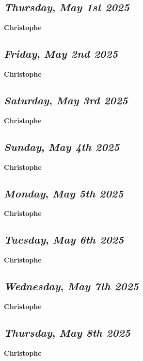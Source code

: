 \begin{center}
\section*{\month}
\end{center}

\def\day{\textit{May 1st 2025}}
\def\weekday{\textit{Thursday}}
\subsection*{\weekday, \day}
\textbf {Christophe}

\def\day{\textit{May 2nd 2025}}
\def\weekday{\textit{Friday}}
\subsection*{\weekday, \day}
\textbf {Christophe}

\def\day{\textit{May 3rd 2025}}
\def\weekday{\textit{Saturday}}
\subsection*{\weekday, \day}
\textbf {Christophe}

\def\day{\textit{May 4th 2025}}
\def\weekday{\textit{Sunday}}
\subsection*{\weekday, \day}
\textbf {Christophe}

\def\day{\textit{May 5th 2025}}
\def\weekday{\textit{Monday}}
\subsection*{\weekday, \day}
\textbf {Christophe}

\def\day{\textit{May 6th 2025}}
\def\weekday{\textit{Tuesday}}
\subsection*{\weekday, \day}
\textbf {Christophe}

\def\day{\textit{May 7th 2025}}
\def\weekday{\textit{Wednesday}}
\subsection*{\weekday, \day}
\textbf {Christophe}

\def\day{\textit{May 8th 2025}}
\def\weekday{\textit{Thursday}}
\subsection*{\weekday, \day}
\textbf {Christophe}

